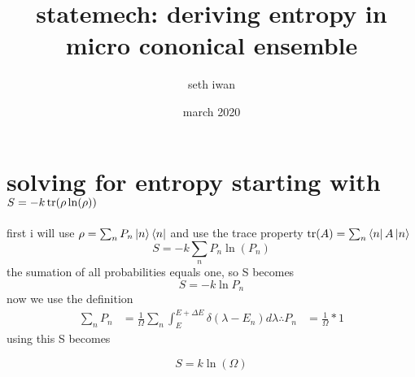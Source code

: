 \documentclass{article}
\title{statemech: deriving entropy in micro cononical ensemble }
\author{seth iwan }
\date{march 2020}
\newcommand{\nm}{\begin{equation}}
\newcommand{\enm}{\end{equation}}
\newcommand{\lp}{\left(}
\newcommand{\rp}{\right)}
\begin{document}
\maketitle
\section{solving for entropy starting with $ S= -k \tr(\rho \ln(\rho))$}
first i will use $\rho =\sum_n P_n \ket{n}\bra{n}$ and use the trace property $\tr(A)=\sum_n \bra{n}A\ket{n}$
\nm
S= -k \sum_n P_n \ln(P_n)
\enm
the sumation of all probabilities equals one, so S becomes
\nm
 S= -k\ln P_n
\enm
now we use the definition 
\begin{align*}
\sum_n P_n& = \frac{1}{\Omega} \sum_n \int_E^{E+\Delta E} \delta \lp \lambda - E_n \rp d\lambda
\therefore P_n &= \frac{1}{\Omega}*1
\end{align*}
using this S becomes

\nm
\boxed{S = k\ln(\Omega)}
\enm
\end{document}

